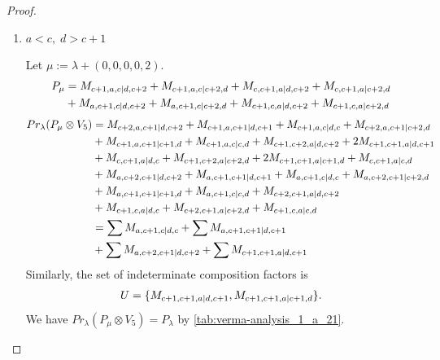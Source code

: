 \begin{proof}
\begin{enumerate}
\begin{enumerate}
\begin{enumerate}
          \item $ a<c,\; d>c+1 $ \par
        Let $\mu:=\lambda + (0,0,0,0,2) $.
        \begin{equation}\notag
          \begin{aligned}
            P_\mu &= M_{c+1,a,c|d,c+2}
+ M_{c+1,a,c|c+2,d}
+ M_{c,c+1,a|d,c+2}
+ M_{c,c+1,a|c+2,d}\\
                                               &
+ M_{a,c+1,c|d,c+2}
+ M_{a,c+1,c|c+2,d}
+ M_{c+1,c,a|d,c+2}
+ M_{c+1,c,a|c+2,d}
          \end{aligned}
        \end{equation}
        \begin{equation}\notag
          \begin{aligned}
            Pr_{\lambda}(P_\mu \otimes V_{5}) &=
M_{c+2,a,c+1|d,c+2}
+ M_{c+1,a,c+1|d,c+1}
+ M_{c+1,a,c|d,c}
+ M_{c+2,a,c+1|c+2,d}\\
                                               &
+ M_{c+1,a,c+1|c+1,d}
+ M_{c+1,a,c|c,d}
+ M_{c+1,c+2,a|d,c+2}
+ 2M_{c+1,c+1,a|d,c+1}\\
                                               &
+ M_{c,c+1,a|d,c}
+ M_{c+1,c+2,a|c+2,d}
+ 2M_{c+1,c+1,a|c+1,d}
+ M_{c,c+1,a|c,d}\\
                                               &
+ M_{a,c+2,c+1|d,c+2}
+ M_{a,c+1,c+1|d,c+1}
+ M_{a,c+1,c|d,c}
+ M_{a,c+2,c+1|c+2,d}\\
                                               &
+ M_{a,c+1,c+1|c+1,d}
+ M_{a,c+1,c|c,d}
+ M_{c+2,c+1,a|d,c+2}\\
                                               &
+ M_{c+1,c,a|d,c}
+ M_{c+2,c+1,a|c+2,d}
+ M_{c+1,c,a|c,d} \\
                                               &=
\sum M_{a,c+1,c|d,c}
+ \sum M_{a,c+1,c+1|d,c+1}\\
                                               &
+ \sum M_{a,c+2,c+1|d,c+2}
+ \sum M_{c+1,c+1,a|d,c+1}
          \end{aligned}
        \end{equation}
      Similarly, the set of indeterminate composition factors is 
\begin{equation}\notag
  \begin{aligned}
    U = \{
M_{c+1,c+1,a|d,c+1},
M_{c+1,c+1,a|c+1,d}
\}.
  \end{aligned}
\end{equation}
       We have $Pr_{\lambda}(P_\mu \otimes V_{5}) = P_\lambda  $ by \cref{tab:verma-analysis_1_a_21}.

\end{enumerate}
\end{enumerate}
\end{enumerate}
\end{proof}
